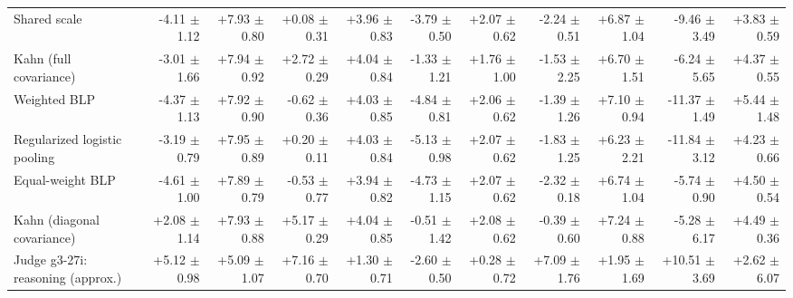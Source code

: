 \begin{tabular}{lrrrrrrrrrr}
Shared scale & -4.11 {\scriptsize $\pm$ 1.12} & +7.93 {\scriptsize $\pm$ 0.80} & +0.08 {\scriptsize $\pm$ 0.31} & +3.96 {\scriptsize $\pm$ 0.83} & -3.79 {\scriptsize $\pm$ 0.50} & +2.07 {\scriptsize $\pm$ 0.62} & -2.24 {\scriptsize $\pm$ 0.51} & +6.87 {\scriptsize $\pm$ 1.04} & -9.46 {\scriptsize $\pm$ 3.49} & +3.83 {\scriptsize $\pm$ 0.59} \\
Kahn (full covariance) & -3.01 {\scriptsize $\pm$ 1.66} & +7.94 {\scriptsize $\pm$ 0.92} & +2.72 {\scriptsize $\pm$ 0.29} & +4.04 {\scriptsize $\pm$ 0.84} & -1.33 {\scriptsize $\pm$ 1.21} & +1.76 {\scriptsize $\pm$ 1.00} & -1.53 {\scriptsize $\pm$ 2.25} & +6.70 {\scriptsize $\pm$ 1.51} & -6.24 {\scriptsize $\pm$ 5.65} & +4.37 {\scriptsize $\pm$ 0.55} \\
Weighted BLP & -4.37 {\scriptsize $\pm$ 1.13} & +7.92 {\scriptsize $\pm$ 0.90} & -0.62 {\scriptsize $\pm$ 0.36} & +4.03 {\scriptsize $\pm$ 0.85} & -4.84 {\scriptsize $\pm$ 0.81} & +2.06 {\scriptsize $\pm$ 0.62} & -1.39 {\scriptsize $\pm$ 1.26} & +7.10 {\scriptsize $\pm$ 0.94} & -11.37 {\scriptsize $\pm$ 1.49} & +5.44 {\scriptsize $\pm$ 1.48} \\
Regularized logistic pooling & -3.19 {\scriptsize $\pm$ 0.79} & +7.95 {\scriptsize $\pm$ 0.89} & +0.20 {\scriptsize $\pm$ 0.11} & +4.03 {\scriptsize $\pm$ 0.84} & -5.13 {\scriptsize $\pm$ 0.98} & +2.07 {\scriptsize $\pm$ 0.62} & -1.83 {\scriptsize $\pm$ 1.25} & +6.23 {\scriptsize $\pm$ 2.21} & -11.84 {\scriptsize $\pm$ 3.12} & +4.23 {\scriptsize $\pm$ 0.66} \\
Equal-weight BLP & -4.61 {\scriptsize $\pm$ 1.00} & +7.89 {\scriptsize $\pm$ 0.79} & -0.53 {\scriptsize $\pm$ 0.77} & +3.94 {\scriptsize $\pm$ 0.82} & -4.73 {\scriptsize $\pm$ 1.15} & +2.07 {\scriptsize $\pm$ 0.62} & -2.32 {\scriptsize $\pm$ 0.18} & +6.74 {\scriptsize $\pm$ 1.04} & -5.74 {\scriptsize $\pm$ 0.90} & +4.50 {\scriptsize $\pm$ 0.54} \\
Kahn (diagonal covariance) & +2.08 {\scriptsize $\pm$ 1.14} & +7.93 {\scriptsize $\pm$ 0.88} & +5.17 {\scriptsize $\pm$ 0.29} & +4.04 {\scriptsize $\pm$ 0.85} & -0.51 {\scriptsize $\pm$ 1.42} & +2.08 {\scriptsize $\pm$ 0.62} & -0.39 {\scriptsize $\pm$ 0.60} & +7.24 {\scriptsize $\pm$ 0.88} & -5.28 {\scriptsize $\pm$ 6.17} & +4.49 {\scriptsize $\pm$ 0.36} \\
Judge g3-27i: reasoning (approx.) & +5.12 {\scriptsize $\pm$ 0.98} & +5.09 {\scriptsize $\pm$ 1.07} & +7.16 {\scriptsize $\pm$ 0.70} & +1.30 {\scriptsize $\pm$ 0.71} & -2.60 {\scriptsize $\pm$ 0.50} & +0.28 {\scriptsize $\pm$ 0.72} & +7.09 {\scriptsize $\pm$ 1.76} & +1.95 {\scriptsize $\pm$ 1.69} & +10.51 {\scriptsize $\pm$ 3.69} & +2.62 {\scriptsize $\pm$ 6.07} \\

\end{tabular}
